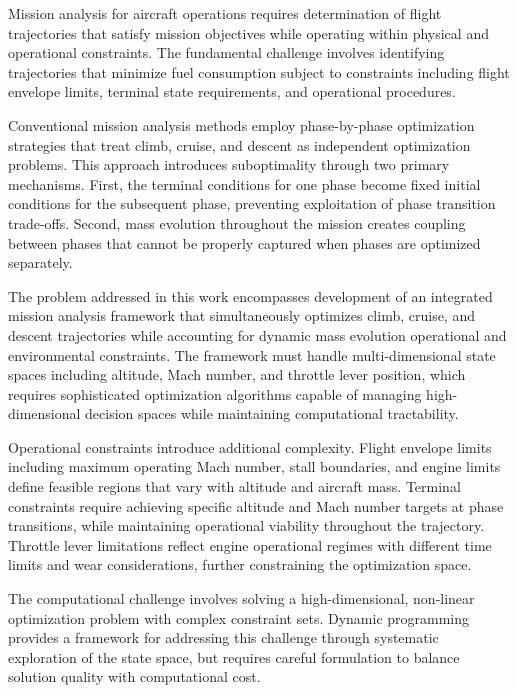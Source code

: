 
Mission analysis for aircraft operations requires determination of flight trajectories that satisfy mission objectives while operating within physical and operational constraints. The fundamental challenge involves identifying trajectories that minimize fuel consumption subject to constraints including flight envelope limits, terminal state requirements, and operational procedures.

Conventional mission analysis methods employ phase-by-phase optimization strategies that treat climb, cruise, and descent as independent optimization problems. This approach introduces suboptimality through two primary mechanisms. First, the terminal conditions for one phase become fixed initial conditions for the subsequent phase, preventing exploitation of phase transition trade-offs. Second, mass evolution throughout the mission creates coupling between phases that cannot be properly captured when phases are optimized separately.

The problem addressed in this work encompasses development of an integrated mission analysis framework that simultaneously optimizes climb, cruise, and descent trajectories while accounting for dynamic mass evolution operational and environmental constraints. The framework must handle multi-dimensional state spaces including altitude, Mach number, and throttle lever position, which requires sophisticated optimization algorithms capable of managing high-dimensional decision spaces while maintaining computational tractability.

Operational constraints introduce additional complexity. Flight envelope limits including maximum operating Mach number, stall boundaries, and engine limits define feasible regions that vary with altitude and aircraft mass. Terminal constraints require achieving specific altitude and Mach number targets at phase transitions, while maintaining operational viability throughout the trajectory. Throttle lever limitations reflect engine operational regimes with different time limits and wear considerations, further constraining the optimization space.

The computational challenge involves solving a high-dimensional, non-linear optimization problem with complex constraint sets. Dynamic programming provides a framework for addressing this challenge through systematic exploration of the state space, but requires careful formulation to balance solution quality with computational cost.  
 
